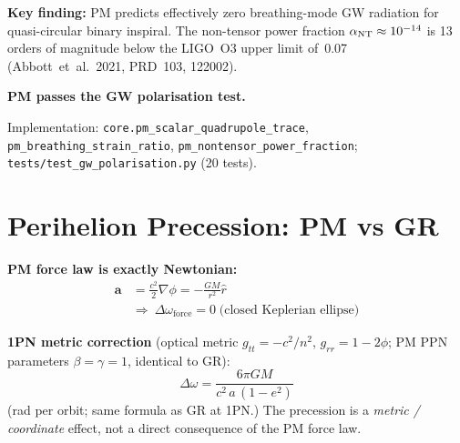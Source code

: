 \documentclass[10pt,twocolumn]{article}
\begin{document}
\begin{center}
\end{center}

\noindent\textbf{Key finding:} PM predicts effectively zero breathing-mode GW radiation
for quasi-circular binary inspiral.  The non-tensor power fraction
$\alpha_{\rm NT} \approx 10^{-14}$ is 13 orders of magnitude below the
LIGO~O3 upper limit of~0.07 (Abbott~et~al.\ 2021, PRD~103, 122002).

\textbf{PM passes the GW polarisation test.}

Implementation: \texttt{core.pm\_scalar\_quadrupole\_trace},
\texttt{pm\_breathing\_strain\_ratio}, \texttt{pm\_nontensor\_power\_fraction};
\texttt{tests/test\_gw\_polarisation.py} (20 tests).

\section{Perihelion Precession: PM vs GR}

\textbf{PM force law is exactly Newtonian:}
\begin{align*}
  \mathbf{a} &= \tfrac{c^2}{2}\nabla\phi = -\frac{GM}{r^2}\hat{r} \\
  &\Longrightarrow\ \Delta\omega_{\mathrm{force}} = 0
  \;\text{(closed Keplerian ellipse)}
\end{align*}

\textbf{1PN metric correction} (optical metric $g_{tt}=-c^2/n^2$, $g_{rr}=1-2\phi$;
PM PPN parameters $\beta=\gamma=1$, identical to GR):
\[
  \boxed{ \Delta\omega = \frac{6\pi GM}{c^2\,a\,(1-e^2)} }
\]
\noindent (rad per orbit; same formula as GR at 1PN.)  The precession is a \emph{metric / coordinate}
effect, not a direct consequence of the PM force law.
\end{document}
